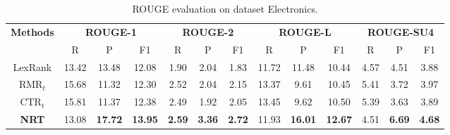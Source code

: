\documentclass[sigconf]{acmart}
\begin{document}
\begin{table*}[!htb]
	\centering
	
	\caption{ROUGE evaluation on dataset Electronics.}
	\label{tab:rouge-elects}
	\begin{tabular}{|c|c|c|c|c|c|c|c|c|c|c|c|c|}
		\hline
		\multirow{2}{*}{\textbf{Methods}} &
		\multicolumn{3}{c|}{\textbf{ROUGE-1}} &
		\multicolumn{3}{c|}{\textbf{ROUGE-2}} &
		\multicolumn{3}{c|}{\textbf{ROUGE-L}} &
		\multicolumn{3}{c|}{\textbf{ROUGE-SU4}} \\
		\cline{2-13}
		& R & P & F1 & R & P & F1& R & P & F1& R & P & F1 \\
		\hline
		LexRank & 13.42 & 13.48 & 12.08
		& 1.90 & 2.04 & 1.83
		& 11.72 & 11.48 & 10.44
		& 4.57 & 4.51 & 3.88 \\
		\hline
		RMR$_t$ & 15.68 & 11.32 & 12.30
		& 2.52 & 2.04 & 2.15
		& 13.37 & 9.61 & 10.45
		& 5.41 & 3.72 & 3.97 \\
		\hline
		CTR$_t$ & 15.81 & 11.37 & 12.38
		& 2.49 & 1.92 & 2.05
		& 13.45 & 9.62 & 10.50
		& 5.39 & 3.63 & 3.89 \\
		\hline
		\textbf{NRT} & 13.08 & \textbf{17.72} & \textbf{13.95}
		& \textbf{2.59} & \textbf{3.36} & \textbf{2.72}
		& 11.93 & \textbf{16.01} & \textbf{12.67}
		& 4.51 & \textbf{6.69} & \textbf{4.68} \\
		\hline
	\end{tabular}
	\vspace{0mm}
\end{table*}
\end{document}
